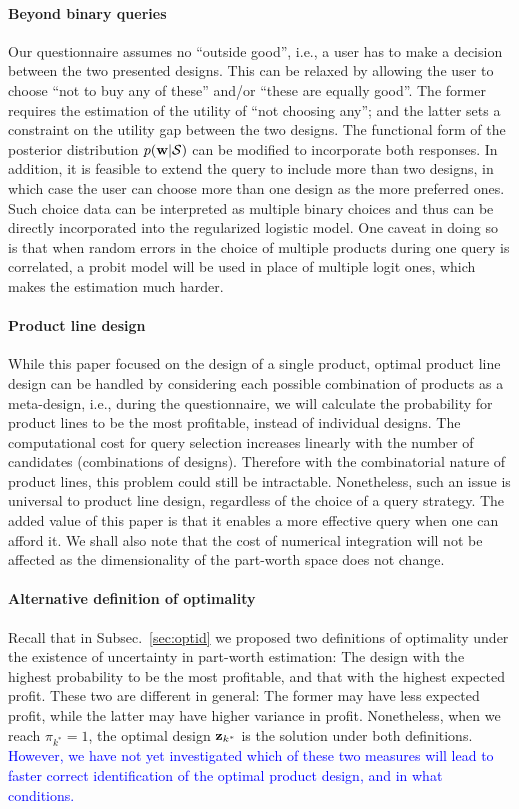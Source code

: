 \documentclass[onecolumn,11pt]{article}
\newcommand{\highlight}[1]{{\textcolor{blue}{{#1}}}}
\newcommand{\highlight}[1]{{{#1}}}
\begin{document}
\paragraph{Beyond binary queries}
\label{subsec:outside}
Our questionnaire assumes no ``outside good'', i.e., a user has to make a decision between the two presented designs. This can be relaxed by allowing the user to choose ``not to buy any of these'' and/or ``these are equally good''. The former requires the estimation of the utility of ``not choosing any''; and the latter sets a constraint on the utility gap between the two designs. The functional form of the posterior distribution $p({\bf w}|\mathcal{S})$ can be modified to incorporate both responses. In addition, it is feasible to extend the query to include more than two designs, in which case the user can choose more than one design as the more preferred ones. Such choice data can be interpreted as multiple binary choices and thus can be directly incorporated into the regularized logistic model. One caveat in doing so is that when random errors in the choice of multiple products during one query is correlated, a probit model will be used in place of multiple logit ones, which makes the estimation much harder.

\paragraph{Product line design}
\label{subsec:productline}
While this paper focused on the design of a single product, optimal product line design can be handled by considering each possible combination of products as a meta-design, i.e., during the questionnaire, we will calculate the probability for product lines to be the most profitable, instead of individual designs. The computational cost for query selection increases linearly with the number of candidates (combinations of designs). Therefore with the combinatorial nature of product lines, this problem could still be intractable. Nonetheless, such an issue is universal to product line design, regardless of the choice of a query strategy. The added value of this paper is that it enables a more effective query when one can afford it. We shall also note that the cost of numerical integration will not be affected as the dimensionality of the part-worth space does not change.

\paragraph{Alternative definition of optimality}
\label{subsec:defopt}
Recall that in Subsec.~\ref{sec:optid} we proposed two definitions of optimality under the existence of uncertainty in part-worth estimation: The design with the highest probability to be the most profitable, and that with the highest expected profit. These two are different in general: The former may have less expected profit, while the latter may have higher variance in profit. Nonetheless, when we reach $\pi_{k^*} = 1$, the optimal design ${\bf z}_{k^*}$ is the solution under both definitions. \highlight{However, we have not yet investigated which of these two measures will lead to faster correct identification of the optimal product design, and in what conditions.}
\end{document}
